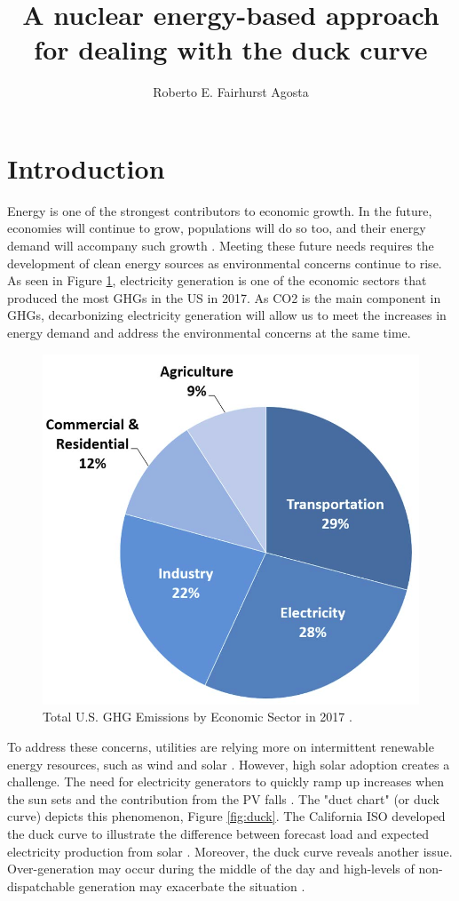 \documentclass{anstrans}
\title{A nuclear energy-based approach for dealing with the duck curve}
\author{Roberto E. Fairhurst Agosta}
\institute{
University of Illinois at Urbana-Champaign, Dept. of Nuclear, Plasma, and Radiological Engineering\\
ref3@illinois.edu
}
\begin{document}
\section{Introduction}
\label{intro}

Energy is one of the strongest contributors to economic growth.
In the future, economies will continue to grow, populations will do so too, and their energy demand will accompany such growth \cite{burke_impact_2018}.
Meeting these future needs requires the development of clean energy sources as environmental concerns continue to rise.
As seen in Figure \ref{fig:ghg}, electricity generation is one of the economic sectors that produced the most \glspl{GHG} in the \gls{US} in 2017.
As \gls{CO2} is the main component in \glspl{GHG}, decarbonizing electricity generation will allow us to meet the increases in energy demand and address the environmental concerns at the same time.

\begin{figure}[htbp!]
	\centering
	\includegraphics[width=0.6\linewidth]{figures/total-ghg-2019-caption2.png}
	\hfill
	\caption{Total U.S. GHG Emissions by Economic Sector in 2017 \cite{us_epa_sources_2020}.}
	\label{fig:ghg}
\end{figure}

To address these concerns, utilities are relying more on intermittent renewable energy resources, such as wind and solar \cite{ming_resource_2019}.
However, high solar adoption creates a challenge. The need for electricity generators to quickly ramp up increases when the sun sets and the contribution from the \gls{PV} falls \cite{us_department_of_energy_confronting_2017}.
The "duct chart" (or duck curve) depicts this phenomenon, Figure \ref{fig:duck}.
The California ISO developed the duck curve to illustrate the difference between forecast load and expected electricity production from solar \cite{bouillon_prepared_2014}.
Moreover, the duck curve reveals another issue. Over-generation may occur during the middle of the day and high-levels of non-dispatchable generation may exacerbate the situation \cite{bouillon_prepared_2014}.
\end{document}

